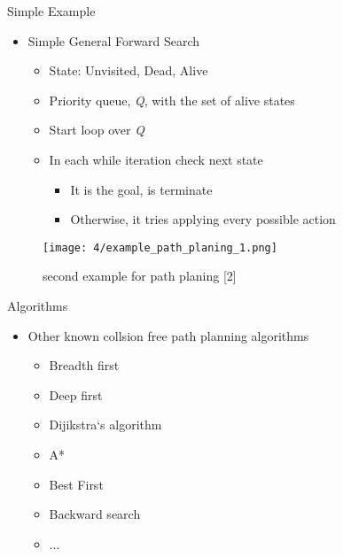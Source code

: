 \documentclass[%
  professionalfonts,%
  xcolor={%
    usenames,%
    dvipsnames,%
    svgnames,%
    table,%
    hyperref%
  }%
]{beamer}
\begin{document}
      \begin{frame}{Simple Example}
        \begin{itemize}
          \item Simple General Forward Search
          \begin{itemize}
            \item State: Unvisited, Dead, Alive
            \item Priority queue, \emph{Q}, with the set of alive states
            \item Start loop over \emph{Q}
            \item In each while iteration check next state
            \begin{itemize}
              \item It is the goal, is terminate
              \item Otherwise, it tries applying every possible action
             \end{itemize} 
          \end{itemize}
        \end{itemize}
        \begin{figure}[h]
          \texttt{[image: 4/example\_path\_planing\_1.png]}
          \caption{second example for path planing [2]}
          \label{fig:example path planing 1}
        \end{figure}
      \end{frame}
      
      \begin{frame}{Algorithms}
        \begin{itemize}
          \item Other known collsion free path planning algorithms
          \begin{itemize}
            \item Breadth first
            \item Deep first
            \item Dijikstra‘s algorithm
            \item A*
            \item Best First
            \item Backward search
            \item ...
          \end{itemize}
        \end{itemize}
      \end{frame}
\end{document}
